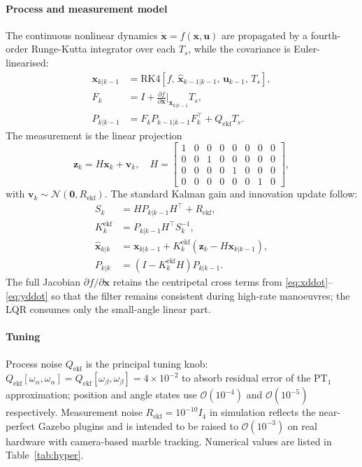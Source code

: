 \documentclass[conference]{IEEEtran}
\begin{document}
\paragraph*{Process and measurement model}
The continuous nonlinear dynamics $\dot{\bm{x}}=f(\bm{x},\bm{u})$ are
propagated by a fourth-order Runge-Kutta integrator over each $T_s$, while
the covariance is Euler-linearised:
\begin{align}
\bm{x}_{k|k-1} &= \mathrm{RK4}\!\left[ f,\, \hat{\bm{x}}_{k-1|k-1},\, \bm{u}_{k-1},\, T_s \right], \label{eq:ekf_pred_x}\\
F_k &= I + \tfrac{\partial f}{\partial \bm{x}}\!\bigg|_{\bm{x}_{k|k-1}}\!T_s, \label{eq:ekf_F}\\
P_{k|k-1} &= F_k P_{k-1|k-1} F_k^\top + Q_{\text{ekf}} T_s. \label{eq:ekf_pred_P}
\end{align}
The measurement is the linear projection
\begin{equation}
\bm{z}_k = H \bm{x}_k + \bm{v}_k,\quad
H = \!\begin{bmatrix}
1 & 0 & 0 & 0 & 0 & 0 & 0 & 0 \\
0 & 0 & 1 & 0 & 0 & 0 & 0 & 0 \\
0 & 0 & 0 & 0 & 1 & 0 & 0 & 0 \\
0 & 0 & 0 & 0 & 0 & 0 & 1 & 0
\end{bmatrix},
\label{eq:ekf_H}
\end{equation}
with $\bm{v}_k\sim\mathcal{N}(\bm{0},R_{\text{ekf}})$. The standard Kalman
gain and innovation update follow:
\begin{align}
S_k &= H P_{k|k-1} H^\top + R_{\text{ekf}}, \label{eq:ekf_S}\\
K^{\text{ekf}}_k &= P_{k|k-1} H^\top S_k^{-1}, \label{eq:ekf_K}\\
\hat{\bm{x}}_{k|k} &= \bm{x}_{k|k-1} + K^{\text{ekf}}_k (\bm{z}_k - H \bm{x}_{k|k-1}), \label{eq:ekf_x}\\
P_{k|k} &= \!\left( I - K^{\text{ekf}}_k H \right) P_{k|k-1}. \label{eq:ekf_P}
\end{align}
The full Jacobian $\partial f/\partial \bm{x}$ retains the centripetal cross
terms from \eqref{eq:xddot}--\eqref{eq:yddot} so that the filter remains
consistent during high-rate manoeuvres; the LQR consumes only the
small-angle linear part.

\paragraph*{Tuning}
Process noise $Q_{\text{ekf}}$ is the principal tuning knob:
$Q_{\text{ekf}}[\omega_\alpha,\omega_\alpha] = Q_{\text{ekf}}[\omega_\beta,\omega_\beta] = 4\!\times\!10^{-2}$
to absorb residual error of the PT$_1$ approximation; position and angle
states use $\mathcal{O}(10^{-4})$ and $\mathcal{O}(10^{-5})$ respectively.
Measurement noise $R_{\text{ekf}} = 10^{-10} I_4$ in simulation reflects
the near-perfect Gazebo plugins and is intended to be raised to
$\mathcal{O}(10^{-3})$ on real hardware with camera-based marble tracking.
Numerical values are listed in Table~\ref{tab:hyper}.
\end{document}
